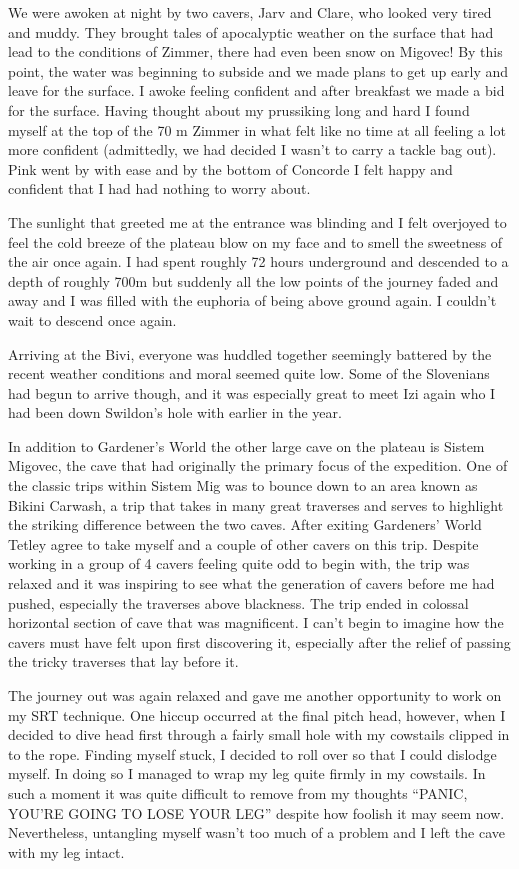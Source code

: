 We were awoken at night by two cavers, Jarv and Clare, who looked very
tired and muddy. They brought tales of apocalyptic weather on the
surface that had lead to the conditions of Zimmer, there had even been
snow on Migovec! By this point, the water was beginning to subside and
we made plans to get up early and leave for the surface. I awoke feeling
confident and after breakfast we made a bid for the surface. Having
thought about my prussiking long and hard I found myself at the top of
the 70 m Zimmer in what felt like no time at all feeling a lot more
confident (admittedly, we had decided I wasn't to carry a tackle bag
out). Pink went by with ease and by the bottom of Concorde I felt happy
and confident that I had had nothing to worry about.

The sunlight that greeted me at the entrance was blinding and I felt
overjoyed to feel the cold breeze of the plateau blow on my face and to
smell the sweetness of the air once again. I had spent roughly 72 hours
underground and descended to a depth of roughly 700m but suddenly all
the low points of the journey faded and away and I was filled with the
euphoria of being above ground again. I couldn't wait to descend once
again.

Arriving at the Bivi, everyone was huddled together seemingly battered
by the recent weather conditions and moral seemed quite low. Some of the
Slovenians had begun to arrive though, and it was especially great to
meet Izi again who I had been down Swildon's hole with earlier in the
year.

In addition to Gardener's World the other large cave on the plateau is
Sistem Migovec, the cave that had originally the primary focus of the
expedition. One of the classic trips within Sistem Mig was to bounce
down to an area known as Bikini Carwash, a trip that takes in many great
traverses and serves to highlight the striking difference between the
two caves. After exiting Gardeners' World Tetley agree to take myself
and a couple of other cavers on this trip. Despite working in a group of
4 cavers feeling quite odd to begin with, the trip was relaxed and it
was inspiring to see what the generation of cavers before me had pushed,
especially the traverses above blackness. The trip ended in colossal
horizontal section of cave that was magnificent. I can't begin to
imagine how the cavers must have felt upon first discovering it,
especially after the relief of passing the tricky traverses that lay
before it.

The journey out was again relaxed and gave me another opportunity to
work on my SRT technique. One hiccup occurred at the final pitch head,
however, when I decided to dive head first through a fairly small hole
with my cowstails clipped in to the rope. Finding myself stuck, I
decided to roll over so that I could dislodge myself. In doing so I
managed to wrap my leg quite firmly in my cowstails. In such a moment it
was quite difficult to remove from my thoughts ``PANIC, YOU'RE GOING TO
LOSE YOUR LEG'' despite how foolish it may seem now. Nevertheless,
untangling myself wasn't too much of a problem and I left the cave with
my leg intact.

